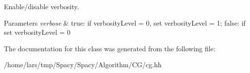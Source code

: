 Enable/disable verbosity. 


\begin{DoxyParams}{Parameters}
{\em verbose} & true\+: if verbosity\+Level = 0, set verbosity\+Level = 1; false\+: if set verbosity\+Level = 0 \\
\hline
\end{DoxyParams}


The documentation for this class was generated from the following file\+:\begin{DoxyCompactItemize}
\item 
/home/lars/tmp/\+Spacy/\+Spacy/\+Algorithm/\+C\+G/cg.\+hh\end{DoxyCompactItemize}
